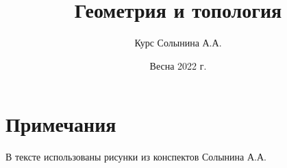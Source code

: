 \documentclass[12pt, a4paper, oneside]{memoir}
\title{Геометрия и топология}
\author{Курс Солынина А.А.}
\date{Весна 2022 г.}
\begin{document}
\frontmatter

\begin{titlingpage}
    \maketitle
\end{titlingpage}

\section*{Примечания}
В тексте использованы рисунки из конспектов Солынина А.А.
\newpage

\tableofcontents
{}


\mainmatter






\end{document}
